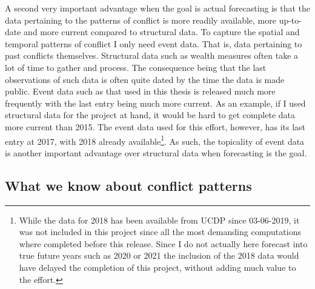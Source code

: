 \documentclass[a4paper]{article}
\begin{document}
A second very important advantage when the goal is actual forecasting is that the data pertaining to the patterns of conflict is more readily available, more up-to-date and more current compared to structural data. To capture the spatial and temporal patterns of conflict I only need event data. That is, data pertaining to past conflicts themselves. Structural data such as wealth measures often take a lot of time to gather and process. The consequence being that the last observations of such data is often quite dated by the time the data is made public. Event data such as that used in this thesis is released much more frequently with the last entry being much more current. As an example, if I used structural data for the project at hand, it would be hard to get complete data more current than 2015. The event data used for this effort, however, has its last entry at 2017, with 2018 already available\footnote{While the data for 2018 has been available from UCDP since 03-06-2019, it was not included in this project since all the most demanding computations where completed before this release. Since I do not actually here forecast into true future years such as 2020 or 2021 the inclusion of the 2018 data would have delayed the completion of this project, without adding much value to the effort.}. As such, the topicality of event data is another important advantage over structural data when forecasting is the goal.\par

\subsection{What we know about conflict patterns}

\end{document}

